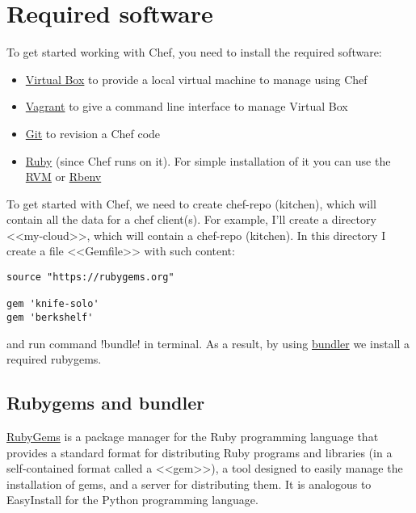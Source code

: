 \section{Required software}
\label{sec:solo-required}

To get started working with Chef, you need to install the required software:

\begin{itemize}
  \item \href{https://www.virtualbox.org/}{Virtual Box} to provide a local virtual machine to manage using Chef
  \item \href{http://www.vagrantup.com/}{Vagrant} to give a command line interface to manage Virtual Box
  \item \href{http://git-scm.com/}{Git} to revision a Chef code
  \item \href{https://www.ruby-lang.org}{Ruby} (since Chef runs on it). For simple installation of it you can use the \href{https://rvm.io/}{RVM} or \href{https://github.com/sstephenson/rbenv}{Rbenv}
\end{itemize}

To get started with Chef, we need to create chef-repo (kitchen), which will contain all the data for a chef client(s). For example, I'll create a directory <<my-cloud>>, which will contain a chef-repo (kitchen). In this directory I create a file <<Gemfile>> with such content:

\begin{lstlisting}[label=lst:my-cloud-required1,title=my-cloud/Gemfile]
source "https://rubygems.org"

gem 'knife-solo'
gem 'berkshelf'
\end{lstlisting}

and run command \inline!bundle! in terminal. As a result, by using \href{http://bundler.io/}{bundler} we install a required rubygems.

\subsection{Rubygems and bundler}

\href{http://rubygems.org/}{RubyGems} is a package manager for the Ruby programming language that provides a standard format for distributing Ruby programs and libraries (in a self-contained format called a <<gem>>), a tool designed to easily manage the installation of gems, and a server for distributing them. It is analogous to EasyInstall for the Python programming language.

